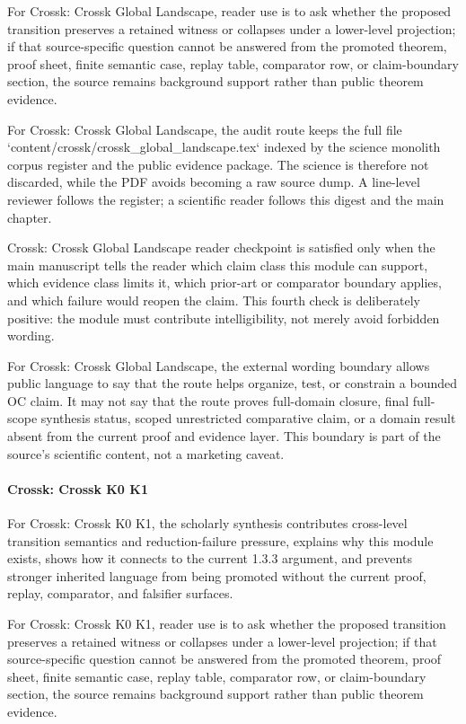 For Crossk: Crossk Global Landscape, reader use is to ask whether the proposed transition preserves a retained witness or collapses under a lower-level projection; if that source-specific question cannot be answered from the promoted theorem, proof sheet, finite semantic case, replay table, comparator row, or claim-boundary section, the source remains background support rather than public theorem evidence.


For Crossk: Crossk Global Landscape, the audit route keeps the full file `content/crossk/crossk\_global\_landscape.tex` indexed by the science monolith corpus register and the public evidence package. The science is therefore not discarded, while the PDF avoids becoming a raw source dump. A line-level reviewer follows the register; a scientific reader follows this digest and the main chapter.


Crossk: Crossk Global Landscape reader checkpoint is satisfied only when the main manuscript tells the reader which claim class this module can support, which evidence class limits it, which prior-art or comparator boundary applies, and which failure would reopen the claim. This fourth check is deliberately positive: the module must contribute intelligibility, not merely avoid forbidden wording.


For Crossk: Crossk Global Landscape, the external wording boundary allows public language to say that the route helps organize, test, or constrain a bounded OC claim. It may not say that the route proves full-domain closure, final full-scope synthesis status, scoped unrestricted comparative claim, or a domain result absent from the current proof and evidence layer. This boundary is part of the source's scientific content, not a marketing caveat.


\paragraph{Crossk: Crossk K0 K1}

For Crossk: Crossk K0 K1, the scholarly synthesis contributes cross-level transition semantics and reduction-failure pressure, explains why this module exists, shows how it connects to the current 1.3.3 argument, and prevents stronger inherited language from being promoted without the current proof, replay, comparator, and falsifier surfaces.


For Crossk: Crossk K0 K1, reader use is to ask whether the proposed transition preserves a retained witness or collapses under a lower-level projection; if that source-specific question cannot be answered from the promoted theorem, proof sheet, finite semantic case, replay table, comparator row, or claim-boundary section, the source remains background support rather than public theorem evidence.


